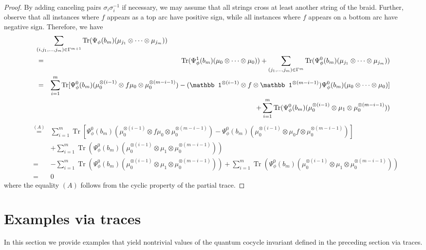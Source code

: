 \documentclass[11pt,fleqn]{amsart} %
\DeclareMathOperator{\tr}{Tr}
\begin{document}
\begin{proof}
						By adding canceling pairs $\sigma_i \sigma_i^{-1}$ if necessary, we may assume that all strings cross at least another string of the braid. 
			Further, observe that all instances where $f$ appears as a top arc have positive sign, while all instances where $f$ appears on a bottom arc have negative sign. Therefore, we have
 			\begin{eqnarray*}
 					\lefteqn{\sum_{(i,j_1,\ldots, j_m)\in \Gamma^{m+1}} \tr(\Psi_\phi(b_m)(\mu_{j_1}\otimes \cdots \otimes \mu_{j_m}))}\\
 					&=& \tr(\Psi^1_\phi(b_m)(\mu_0\otimes \cdots \otimes \mu_0)) + \sum_{(j_1,\ldots, j_m)\in \Gamma^m} \tr(\Psi^0_\phi(b_m)(\mu_{j_1}\otimes \cdots \otimes \mu_{j_m}))\\
 					&=& \sum_{i=1}^m \tr[\Psi^0_\phi(b_m)(\mu_0^{\otimes (i-1)  }\otimes f\mu_0\otimes \mu_0^{\otimes (m-i-1) }) - (\mathbb 1^{\otimes (i-1) }\otimes f\otimes \mathbb 1^{\otimes ( m-i-1) })\Psi^0_\phi(b_m)(\mu_0 \otimes \cdots \otimes \mu_0)]\\
 					&& + \sum_{i=1}^m \tr(\Psi^0_\phi(b_m)(\mu_0^{\otimes (i-1) }\otimes \mu_1\otimes \mu_0^{\otimes (m-i-1) })) %
					\end{eqnarray*}
					\begin{eqnarray*}
 					&\stackrel{(A)}{=} & \sum_{i=1}^m \tr[\Psi^0_\phi(b_m)(\mu_0^{\otimes (i-1)}\otimes f\mu_0\otimes \mu_0^{\otimes (m-i-1)}) - \Psi^0_\phi(b_m)(\mu_0^{\otimes (i-1) }\otimes \mu_0f\otimes \mu_0^{\otimes (m-i-1) })]\\
 					&& + \sum_{i=1}^m \tr(\Psi^0_\phi(b_m)(\mu_0^{\otimes (i-1)}\otimes \mu_1\otimes \mu_0^{\otimes (m-i-1)  }))\\
 					&=& - \sum_{i=1}^m \tr(\Psi^0_\phi(b_m)(\mu_0^{\otimes (i-1)}\otimes \mu_1\otimes \mu_0^{\otimes (m-i-1) })) + \sum_{i=1}^m \tr(\Psi^0_\phi(b_m)(\mu_0^{\otimes (i-1)}\otimes \mu_1\otimes \mu_0^{\otimes (m-i-1)}))\\
 					&=& 0
 			\end{eqnarray*}
 where the equality $(A)$ follows from the cyclic property of the partial trace.
 \end{proof}
	

\section{Examples   via traces  }\label{sec:traces}


In this section we provide examples that yield nontrivial values of the quantum cocycle invariant defined in the preceding section via traces.
\end{document}
